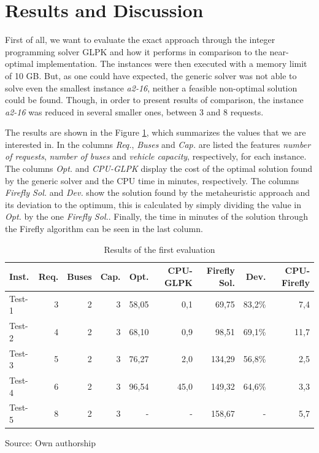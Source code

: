 \documentclass[tuberlin,cic,tc,openright,english,noabntcite,oneside]{iiufrgs}
\begin{document}
\section{Results and Discussion}
First of all, we want to evaluate the exact approach through the integer programming solver GLPK and how it performs in comparison to the near-optimal implementation. The instances were then executed with a memory limit of 10 GB. But, as one could have expected, the generic solver was not able to solve even the smallest instance \emph{a2-16}, neither a feasible non-optimal solution could be found. Though, in order to present results of comparison, the instance \emph{a2-16} was reduced in several smaller ones, between 3 and 8 requests.

The results are shown in the Figure \ref{tab:evaluation-1}, which summarizes the values that we are interested in. In the columns \emph{Req.}, \emph{Buses} and \emph{Cap.} are listed the features \emph{number of requests}, \emph{number of buses} and \emph{vehicle capacity}, respectively, for each instance. The columns \emph{Opt.} and \emph{CPU-GLPK} display the cost of the optimal solution found by the generic solver and the CPU time in minutes, respectively. The columns \emph{Firefly Sol.} and \emph{Dev.} show the solution found by the metaheuristic approach and its deviation to the optimum, this is calculated by simply dividing the value in \emph{Opt.} by the one \emph{Firefly Sol.}. Finally, the time in minutes of the solution through the Firefly algorithm can be seen in the last column.
\begin{table}[H]
\centering
\caption{Results of the first evaluation}
\begin{tabular}{l | r | r | r | r | r | r | r | r}
\hline
Inst. & Req. & Buses & Cap. & Opt. & CPU-GLPK & Firefly Sol. & Dev. & CPU-Firefly\\
\hline
Test-1 & 	3 & 	2 & 	3 & 	58,05 & 	0,1 & 	69,75 & 	83,2\% & 	7,4 \\
Test-2 & 	4 & 	2 & 	3 & 	68,10 & 	0,9 & 	98,51 & 	69,1\% & 	11,7 \\
Test-3 & 	5 & 	2 & 	3 & 	76,27 & 	2,0 & 	134,29 & 	56,8\% & 	2,5 \\
Test-4 & 	6 & 	2 & 	3 & 	96,54 & 	45,0 & 	149,32 & 	64,6\% & 	3,3 \\
Test-5 & 	8 & 	2 & 	3 & 	- & 	- & 	158,67 & 	- & 	5,7 \\
\hline
\end{tabular}
\center Source: Own authorship
\label{tab:evaluation-1}
\end{table}
\end{document}
